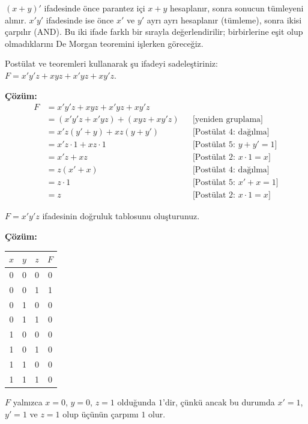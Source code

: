 \begin{ornek}
$(x+y)'$ ifadesinde önce parantez içi $x+y$ hesaplanır, sonra sonucun tümleyeni alınır.
$x'y'$ ifadesinde ise önce $x'$ ve $y'$ ayrı ayrı hesaplanır (tümleme), sonra ikisi çarpılır
(AND). Bu iki ifade farklı bir sırayla değerlendirilir; birbirlerine eşit olup olmadıklarını
De Morgan teoremini işlerken göreceğiz.
\end{ornek}

\begin{alistirma}[\orta]
Postülat ve teoremleri kullanarak şu ifadeyi sadeleştiriniz:
$F=x'y'z+xyz+x'yz+xy'z$.
\end{alistirma}

\noindent\textbf{Çözüm:}
\begin{align*}
F &= x'y'z+xyz+x'yz+xy'z \\
  &= (x'y'z+x'yz)+(xyz+xy'z) & &\text{[yeniden gruplama]}\\
  &= x'z(y'+y)+xz(y+y') & &\text{[Postülat 4: dağılma]}\\
  &= x'z\cdot 1+xz\cdot 1 & &\text{[Postülat 5: } y+y'=1 \text{]}\\
  &= x'z+xz & &\text{[Postülat 2: } x\cdot 1=x \text{]}\\
  &= z(x'+x) & &\text{[Postülat 4: dağılma]}\\
  &= z\cdot 1 & &\text{[Postülat 5: } x'+x=1 \text{]}\\
  &= z & &\text{[Postülat 2: } x\cdot 1=x \text{]}
\end{align*}

\begin{alistirma}[\kolay]
$F=x'y'z$ ifadesinin doğruluk tablosunu oluşturunuz.
\end{alistirma}

\noindent\textbf{Çözüm:}
\begin{center}
\begin{tabular}{ccc|c}
\toprule
$x$ & $y$ & $z$ & $F$ \\
\midrule
0&0&0&0\\
0&0&1&1\\
0&1&0&0\\
0&1&1&0\\
1&0&0&0\\
1&0&1&0\\
1&1&0&0\\
1&1&1&0\\
\bottomrule
\end{tabular}
\end{center}
$F$ yalnızca $x=0$, $y=0$, $z=1$ olduğunda $1$'dir, çünkü ancak bu durumda $x'=1$,
$y'=1$ ve $z=1$ olup üçünün çarpımı $1$ olur.

